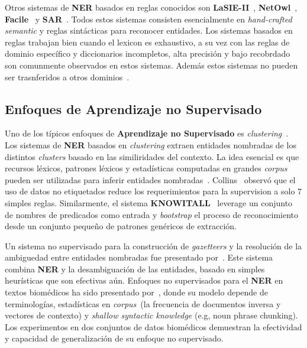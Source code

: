 Otros sistemas de \textbf{NER} basados en reglas conocidos son \textbf{LaSIE-II}~\cite{humphreys1998university}, \textbf{NetOwl}~\cite{krupka2005description}, \textbf{Facile}~\cite{black1998facile} y \textbf{SAR}~\cite{aone1998sra}. Todos estos sistemas consisten esencialmente en \emph{hand-crafted semantic} y reglas sint\'acticas para reconocer entidades. Los sistemas basados en reglas trabajan bien cuando el lexicon es exhaustivo, a su vez con las reglas de dominio espec\'ifico y diccionarios incompletos, alta precisi\'on y bajo recobrdado son comunmente observados en estos sistemas. Adem\'as estos sistemas no pueden ser trasnferidos a otros dominios~\cite{li2018survey}.


\subsection{Enfoques de Aprendizaje no Supervisado}  

Uno de los t\'ipicos enfoques de \textbf{Aprendizaje no Supervisado} es \emph{clustering}~\cite{nadeau2007survey}. Los sistemas de \textbf{NER} basados en \emph{clustering} extraen entidades nombradas de los distintos \emph{clusters} basado en las similiridades del contexto. La idea esencial es que recursos l\'exicos, patrones l\'exicos y estad\'isticas computadas en grandes \emph{corpus} pueden ser utilizadas para inferir entidades nombradas~\cite{li2018survey}. Collins~\cite{collins1999unsupervised} observ\'o que el uso de datos no etiquetados reduce los requerimientos para la supervision a solo 7 simples reglas. Similarmente, el sistema \textbf{KNOWITALL}~\cite{etzioni2005unsupervised} leverage un conjunto de nombres de predicados como entrada y \emph{bootstrap} el proceso de reconocimiento desde un conjunto peque\~no de patrones gen\'ericos de extracci\'on.

Un sistema no supervisado para la construcci\'on de \emph{gazetteers} y la resoluci\'on de la ambiguedad entre entidades nombradas fue presentado por~\cite{nadeau2006unsupervised}. Este sistema combina \textbf{NER} y la 
desambiguación de las entidades, basado en simples heur\'isticas que son efectivas a\'un. Enfoques no supervisados para el \textbf{NER} en textos biom\'edicos ha sido presentado por~\cite{zhang2013unsupervised}, donde su modelo depende de terminolog\'ias, estad\'isticas en \emph{corpus}~(la frecuencia de documentos inversa y vectores de contexto) y \emph{shallow syntactic knowledge} (e.g, noun phrase chunking). Los experimentos en dos conjuntos de datos biom\'edicos demuestran la efectividad y capacidad de generalizaci\'on de su enfoque no supervisado.


